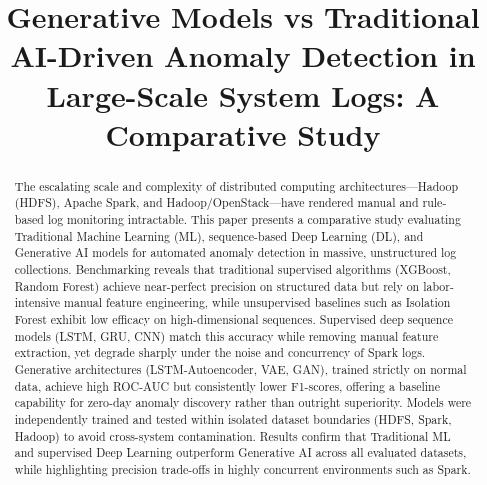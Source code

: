 \documentclass[conference]{IEEEtran}
\begin{document}
\title{Generative Models vs Traditional AI-Driven Anomaly Detection in Large-Scale System Logs: A Comparative Study}

\author{
\and
{}
}
\maketitle

\begin{abstract}
The escalating scale and complexity of distributed computing architectures---Hadoop (HDFS), Apache Spark, and Hadoop/OpenStack---have rendered manual and rule-based log monitoring intractable. This paper presents a comparative study evaluating Traditional Machine Learning (ML), sequence-based Deep Learning (DL), and Generative AI models for automated anomaly detection in massive, unstructured log collections. Benchmarking reveals that traditional supervised algorithms (XGBoost, Random Forest) achieve near-perfect precision on structured data but rely on labor-intensive manual feature engineering, while unsupervised baselines such as Isolation Forest exhibit low efficacy on high-dimensional sequences. Supervised deep sequence models (LSTM, GRU, CNN) match this accuracy while removing manual feature extraction, yet degrade sharply under the noise and concurrency of Spark logs. Generative architectures (LSTM-Autoencoder, VAE, GAN), trained strictly on normal data, achieve high ROC-AUC but consistently lower F1-scores, offering a baseline capability for zero-day anomaly discovery rather than outright superiority. Models were independently trained and tested within isolated dataset boundaries (HDFS, Spark, Hadoop) to avoid cross-system contamination. Results confirm that Traditional ML and supervised Deep Learning outperform Generative AI across all evaluated datasets, while highlighting precision trade-offs in highly concurrent environments such as Spark.
\end{abstract}
\end{document}
